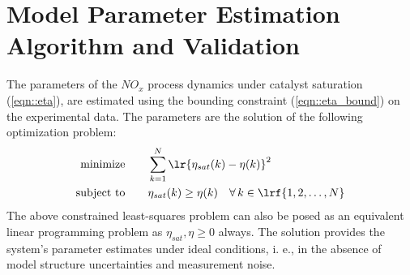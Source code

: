 \section{Model Parameter Estimation Algorithm and Validation}
The parameters of the $NO_x$ process dynamics under catalyst saturation (\ref{eqn::eta}), are estimated using the bounding constraint (\ref{eqn::eta_bound}) on the experimental data. The parameters are the solution of the following optimization problem:
\begin{align}
\text{minimize} &\qquad \sum_{k=1}^{N} \lr{ \eta_{sat}(k) - \eta(k)} ^2 \\
\text{subject to} &\qquad \eta_{sat}(k) \geq \eta(k) \quad \forall \, k \in \lrf{1,2,\hdots, N} \notag
\end{align}
The above constrained least-squares problem can also be posed as an equivalent linear programming problem as $\eta_{sat}, \eta \geq 0$ always. The solution provides the system's parameter estimates under ideal conditions, i.
e., in the absence of model structure uncertainties and measurement noise.
